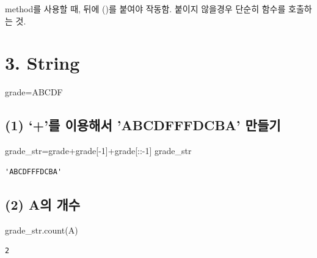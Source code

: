 \documentclass[
  a4paper,
  DIV=11,
  numbers=noendperiod]{scrreprt}
\newenvironment{Shaded}{\begin{snugshade}}{\end{snugshade}}
\newcommand{\DecValTok}[1]{\textcolor[rgb]{0.68,0.00,0.00}{#1}}
\newcommand{\NormalTok}[1]{\textcolor[rgb]{0.00,0.23,0.31}{#1}}
\newcommand{\OperatorTok}[1]{\textcolor[rgb]{0.37,0.37,0.37}{#1}}
\newcommand{\StringTok}[1]{\textcolor[rgb]{0.13,0.47,0.30}{#1}}
\begin{document}
method를 사용할 때, 뒤에 ()를 붙여야 작동함. 붙이지 않을경우 단순히
함수를 호출하는 것.

\section*{3. String}\label{string}


\begin{Shaded}
\begin{Highlighting}[]
\NormalTok{grade}\OperatorTok{=}\StringTok{\textquotesingle{}ABCDF\textquotesingle{}}
\end{Highlighting}
\end{Shaded}

\subsection*{(1) `+'를 이용해서 'ABCDFFFDCBA'
만들기}\label{uxb97c-uxc774uxc6a9uxd574uxc11c-abcdfffdcba-uxb9ccuxb4e4uxae30}

\begin{Shaded}
\begin{Highlighting}[]
\NormalTok{grade\_str}\OperatorTok{=}\NormalTok{grade}\OperatorTok{+}\NormalTok{grade[}\OperatorTok{{-}}\DecValTok{1}\NormalTok{]}\OperatorTok{+}\NormalTok{grade[::}\OperatorTok{{-}}\DecValTok{1}\NormalTok{]}
\NormalTok{grade\_str}
\end{Highlighting}
\end{Shaded}

\begin{verbatim}
'ABCDFFFDCBA'
\end{verbatim}

\subsection*{(2) A의 개수}\label{auxc758-uxac1cuxc218}

\begin{Shaded}
\begin{Highlighting}[]
\NormalTok{grade\_str.count(}\StringTok{\textquotesingle{}A\textquotesingle{}}\NormalTok{)}
\end{Highlighting}
\end{Shaded}

\begin{verbatim}
2
\end{verbatim}
\end{document}
